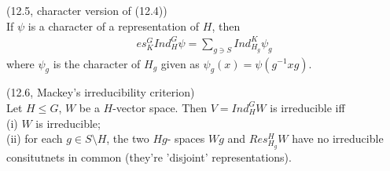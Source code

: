 \documentclass[a4paper]{article}
\begin{document}
\begin{coro} (12.5, character version of (12.4))\\
If $\psi$ is a character of a representation of $H$, then
\begin{equation*}
\begin{aligned}
es_K^G Ind_H^G \psi = \sum_{g \ni S} Ind_{H_g}^K \psi_g
\end{aligned}
\end{equation*}
where $\psi_g$ is the character of $H_g$ given as $\psi_g(x) = \psi(g^{-1} xg)$.
\end{coro}

\begin{coro} (12.6, Mackey's irreducibility criterion)\\
Let $H \leq G$, $W$ be a $H$-vector space. Then $V = Ind_H^G W$ is irreducible iff\\
(i) $W$ is irreducible;\\
(ii) for each $g \in S\setminus H$, the two $Hg$- spaces $Wg$ and $Res_{H_g}^H W$ have no irreducible consitutnets in common (they're 'disjoint' representations).
\end{coro}

\end{document}
